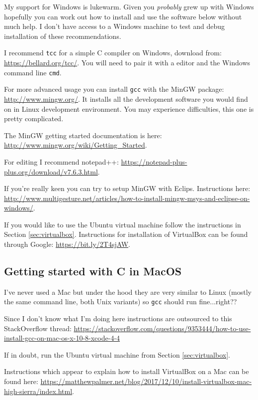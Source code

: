 \documentclass{lab}
\begin{document}
My support for Windows is lukewarm. Given you \textit{probably} grew up with Windows hopefully you can work out how to install and use the software below without much help. I don't have access to a Windows machine to test and debug installation of these recommendations.

I recommend \texttt{tcc} for a simple C compiler on Windows, download from: \url{https://bellard.org/tcc/}. You will need to pair it with a editor and the Windows command line \texttt{cmd}.

For more advanced usage you can install \texttt{gcc} with the MinGW package: \url{http://www.mingw.org/}. It installs all the development software you would find on in Linux development environment. You may experience difficulties, this one is pretty complicated.

The MinGW getting started documentation is here: \url{http://www.mingw.org/wiki/Getting_Started}.

For editing I recommend notepad++: \url{https://notepad-plus-plus.org/download/v7.6.3.html}.

If you're really keen you can try to setup MinGW with Eclips. Instructions here: \url{http://www.multigesture.net/articles/how-to-install-mingw-msys-and-eclipse-on-windows/}.

If you would like to use the Ubuntu virtual machine follow the instructions in Section \ref{sec:virtualbox}. Instructions for installation of VirtualBox can be found through Google: \url{https://bit.ly/2T4sjAW}.

\subsection{Getting started with C in MacOS}

I've never used a Mac but under the hood they are very similar to Linux (mostly the same command line, both Unix variants) so \texttt{gcc} should run fine...right??

Since I don't know what I'm doing here instructions are outsourced to this StackOverflow thread: \url{https://stackoverflow.com/questions/9353444/how-to-use-install-gcc-on-mac-os-x-10-8-xcode-4-4}

If in doubt, run the Ubuntu virtual machine from Section \ref{sec:virtualbox}.

Instructions which appear to explain how to install VirtualBox on a Mac can be found here: \url{https://matthewpalmer.net/blog/2017/12/10/install-virtualbox-mac-high-sierra/index.html}.
\end{document}
